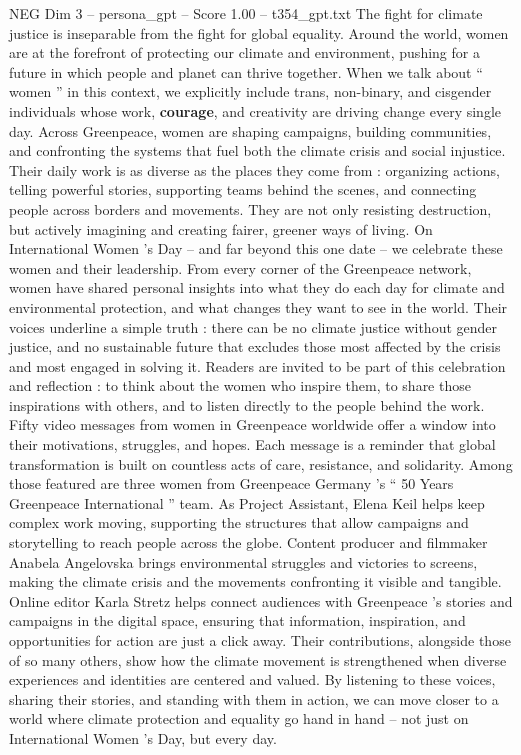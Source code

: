 \begin{textsample}{NEG Dim 3 – persona\_gpt – Score 1.00 – t354\_gpt.txt}  \label{ex:f3_neg_038}
The fight for climate justice is inseparable from the fight for global equality.
Around the world, women are at the forefront of protecting our climate and environment, pushing for a future in which people and planet can thrive together.
When we talk about “ women ” in this context, we explicitly include trans, non-binary, and cisgender individuals whose work, \textbf{courage}, and creativity are driving change every single day.
Across Greenpeace, women are shaping campaigns, building communities, and confronting the systems that fuel both the climate crisis and social injustice.
Their daily work is as diverse as the places they come from : organizing actions, telling powerful stories, supporting teams behind the scenes, and connecting people across borders and movements.
They are not only resisting destruction, but actively imagining and creating fairer, greener ways of living.
On International Women ’s Day – and far beyond this one date – we celebrate these women and their leadership.
From every corner of the Greenpeace network, women have shared personal insights into what they do each day for climate and environmental protection, and what changes they want to see in the world.
Their voices underline a simple truth : there can be no climate justice without gender justice, and no sustainable future that excludes those most affected by the crisis and most engaged in solving it.
Readers are invited to be part of this celebration and reflection : to think about the women who inspire them, to share those inspirations with others, and to listen directly to the people behind the work.
Fifty video messages from women in Greenpeace worldwide offer a window into their motivations, struggles, and hopes.
Each message is a reminder that global transformation is built on countless acts of care, resistance, and solidarity.
Among those featured are three women from Greenpeace Germany ’s “ 50 Years Greenpeace International ” team.
As Project Assistant, Elena Keil helps keep complex work moving, supporting the structures that allow campaigns and storytelling to reach people across the globe.
Content producer and filmmaker Anabela Angelovska brings environmental struggles and victories to screens, making the climate crisis and the movements confronting it visible and tangible.
Online editor Karla Stretz helps connect audiences with Greenpeace ’s stories and campaigns in the digital space, ensuring that information, inspiration, and opportunities for action are just a click away.
Their contributions, alongside those of so many others, show how the climate movement is strengthened when diverse experiences and identities are centered and valued.
By listening to these voices, sharing their stories, and standing with them in action, we can move closer to a world where climate protection and equality go hand in hand – not just on International Women ’s Day, but every day.

\end{textsample}
